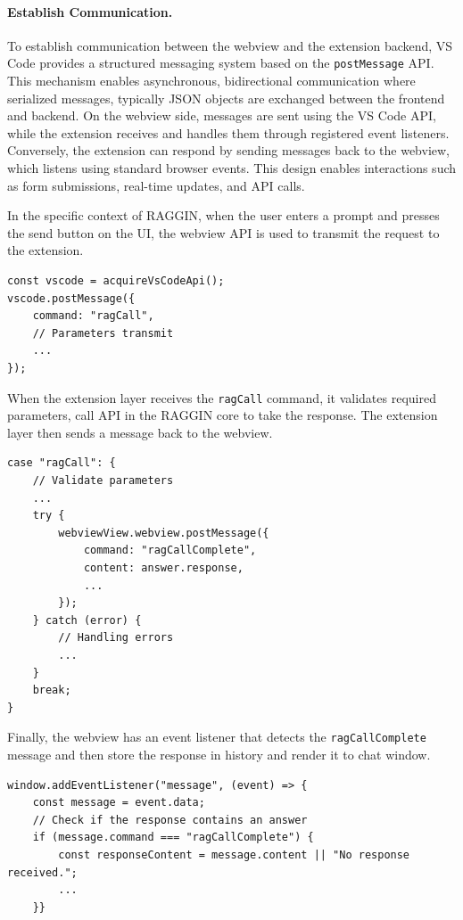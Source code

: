 \paragraph*{Establish Communication.} To establish communication between the webview and the extension backend, VS Code provides a structured messaging system based on the \texttt{postMessage} API. This mechanism enables asynchronous, bidirectional communication where serialized messages, typically JSON objects are exchanged between the frontend and backend. On the webview side, messages are sent using the VS Code API, while the extension receives and handles them through registered event listeners. Conversely, the extension can respond by sending messages back to the webview, which listens using standard browser events. This design enables interactions such as form submissions, real-time updates, and API calls. 

In the specific context of RAGGIN, when the user enters a prompt and presses the send button on the UI, the webview API is used to transmit the request to the extension.
\begin{lstlisting}[caption=Handle chat storing]
const vscode = acquireVsCodeApi();
vscode.postMessage({
	command: "ragCall",
	// Parameters transmit
	...
});
\end{lstlisting}

When the extension layer receives the \texttt{ragCall} command, it validates required parameters, call API in the RAGGIN core to take the response. The extension layer then sends a message back to the webview.

\begin{lstlisting}[caption=Extension layer receives command from webview]
case "ragCall": {
	// Validate parameters
	...	
	try {
		webviewView.webview.postMessage({
			command: "ragCallComplete",
			content: answer.response,
			...
		});
	} catch (error) {
		// Handling errors
		...
	}
	break;
}
\end{lstlisting}

Finally, the webview has an event listener that detects the \texttt{ragCallComplete} message and then store the response in history and render it to chat window.

\begin{lstlisting}[caption=Listener to detect message]
window.addEventListener("message", (event) => {
	const message = event.data;
	// Check if the response contains an answer
	if (message.command === "ragCallComplete") {
		const responseContent = message.content || "No response received.";
		...
	}}
\end{lstlisting}


